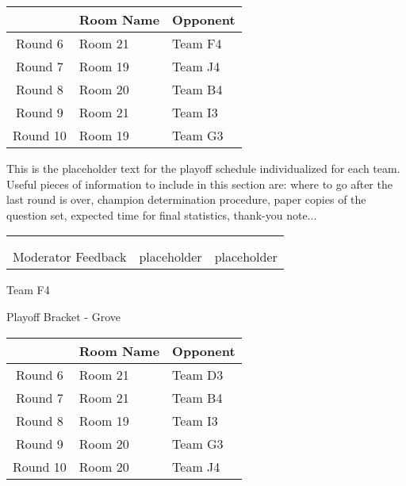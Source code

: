 \documentclass{article}%
\begin{document}
\vspace*{4pt}%
%
\begin{tabularx}{\textwidth}{|c|Y|Y|}%
\hline%
&Room Name&Opponent\\%
\hline%
Round 6&Room 21&Team F4\\%
Round 7&Room 19&Team J4\\%
Round 8&Room 20&Team B4\\%
Round 9&Room 21&Team I3\\%
Round 10&Room 19&Team G3\\%
\hline%
\end{tabularx}%
\vspace*{30pt}%
\linebreak%
This is the placeholder text for the playoff schedule individualized for each team. Useful pieces of information to include in this section are: where to go after the last round is over, champion determination procedure, paper copies of the question set, expected time for final statistics, thank{-}you note...%
\vspace*{30pt}%
\newline%
%
\begin{tabularx}{\textwidth}{YYY}%
  &  &  \\%
\\%
Moderator Feedback&placeholder&placeholder\\%
\end{tabularx}%
\newpage%
\begin{center}%
\begin{Huge}%
Team F4%
\end{Huge}%
\vspace*{12pt}%
\linebreak%
\begin{Large}%
Playoff Bracket {-} Grove%
\end{Large}%
\end{center}%
\vspace*{4pt}%
%
\begin{tabularx}{\textwidth}{|c|Y|Y|}%
\hline%
&Room Name&Opponent\\%
\hline%
Round 6&Room 21&Team D3\\%
Round 7&Room 21&Team B4\\%
Round 8&Room 19&Team I3\\%
Round 9&Room 20&Team G3\\%
Round 10&Room 20&Team J4\\%
\hline%
\end{tabularx}%
\end{document}
